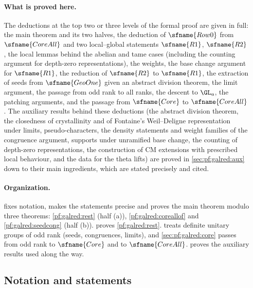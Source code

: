 \paragraph{What is proved here.} The deductions at the top two or three levels of the formal proof are given in
full: the main theorem and its two halves, the deduction of $\sfname{Row0}$ from $\sfname{CoreAll}$ and two
local--global statements $\sfname{R1}$, $\sfname{R2}$, the local lemmas behind the abelian and tame cases
(including the counting argument for depth-zero representations), the weights, the base change argument for
$\sfname{R1}$, the reduction of $\sfname{R2}$ to $\sfname{R1}$, the extraction of seeds from $\sfname{GeoOne}$
given an abstract division theorem, the limit argument, the passage from odd rank to all ranks, the descent to
$\GL_a$, the patching arguments, and the passage from $\sfname{Core}$ to $\sfname{CoreAll}$. The auxiliary results behind
these deductions (the abstract division theorem, the closedness of crystallinity and of Fontaine's Weil--Deligne
representation under limits, pseudo-characters, the density statements and weight families of the congruence argument,
supports under unramified base change, the counting of depth-zero representations, the construction of CM extensions with
prescribed local behaviour, and the data for the theta lifts) are proved in \cref{sec:pf:galred:aux} down to their main
ingredients, which are stated precisely and cited.

\paragraph{Organization.}  fixes notation, makes the statements precise and proves the
main theorem modulo three theorems: \cref{pf:galred:rest} (half (a)), \cref{pf:galred:coreallof} and
\cref{pf:galred:seedcong} (half (b)).  proves \cref{pf:galred:rest}.
 treats definite unitary groups of odd rank (seeds, congruences, limits), and
\cref{sec:pf:galred:core} passes from odd rank to $\sfname{Core}$ and to $\sfname{CoreAll}$.  proves
the auxiliary results used along the way.

\subsection{Notation and statements}\label{sec:pf:galred:stmts}

